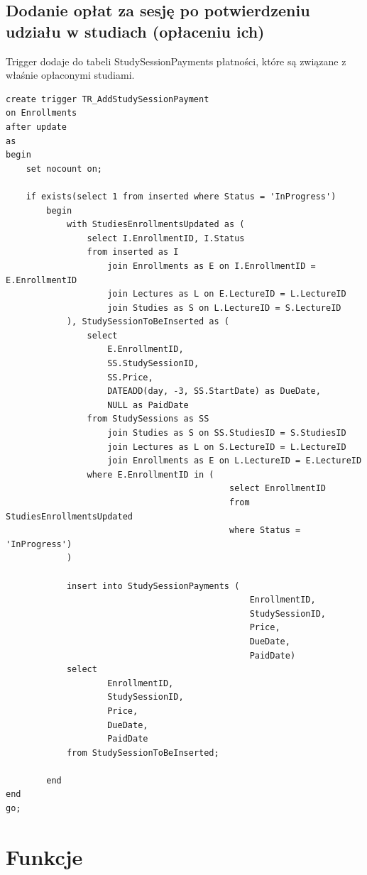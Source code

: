 \documentclass[11pt,a4paper]{article}
\begin{document}
\subsection{Dodanie opłat za sesję po potwierdzeniu udziału w studiach (opłaceniu ich)}
Trigger dodaje do tabeli StudySessionPayments płatności, które są związane z właśnie opłaconymi studiami. 
\begin{Verbatim}[breaklines=true]
create trigger TR_AddStudySessionPayment
on Enrollments
after update
as
begin
    set nocount on;

    if exists(select 1 from inserted where Status = 'InProgress')
        begin
            with StudiesEnrollmentsUpdated as (
                select I.EnrollmentID, I.Status
                from inserted as I
                    join Enrollments as E on I.EnrollmentID = E.EnrollmentID
                    join Lectures as L on E.LectureID = L.LectureID
                    join Studies as S on L.LectureID = S.LectureID
            ), StudySessionToBeInserted as (
                select 
                    E.EnrollmentID, 
                    SS.StudySessionID, 
                    SS.Price, 
                    DATEADD(day, -3, SS.StartDate) as DueDate, 
                    NULL as PaidDate
                from StudySessions as SS
                    join Studies as S on SS.StudiesID = S.StudiesID
                    join Lectures as L on S.LectureID = L.LectureID
                    join Enrollments as E on L.LectureID = E.LectureID
                where E.EnrollmentID in (
                                            select EnrollmentID 
                                            from StudiesEnrollmentsUpdated 
                                            where Status = 'InProgress')
            )

            insert into StudySessionPayments (
                                                EnrollmentID, 
                                                StudySessionID, 
                                                Price, 
                                                DueDate, 
                                                PaidDate)
            select 
                    EnrollmentID, 
                    StudySessionID, 
                    Price, 
                    DueDate, 
                    PaidDate 
            from StudySessionToBeInserted;
            
        end
end
go;
\end{Verbatim}


\section{Funkcje}
\end{document}
